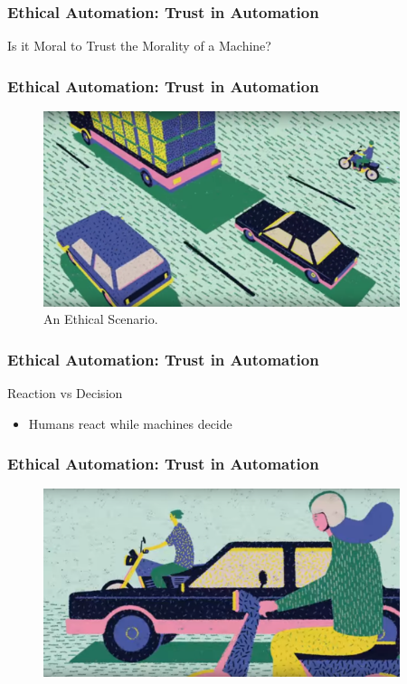 \begin{frame}
  \frametitle{ Ethical Automation: Trust in Automation}
  \Large{Is it Moral to Trust the Morality of a Machine?}
\end{frame}


\begin{frame}
  \frametitle{ Ethical Automation: Trust in Automation}
  \begin{figure}[bht]
    \centering
    \includegraphics[width=4.1in]{diagrams/image00}
    \caption{An Ethical Scenario.}
    \label{fig:-deg}
  \end{figure}
\end{frame}


\begin{frame}
  \frametitle{ Ethical Automation: Trust in Automation}
  {\Large Reaction vs Decision}
  \begin{itemize}
  \item Humans react while machines decide
  \end{itemize}
\end{frame}


\begin{frame}
  \frametitle{ Ethical Automation: Trust in Automation}
  \begin{figure}[bht]
    \centering
    \includegraphics[width=4.1in]{diagrams/image01}
    \caption{}
    \label{fig:-deg}
  \end{figure}
\end{frame}


